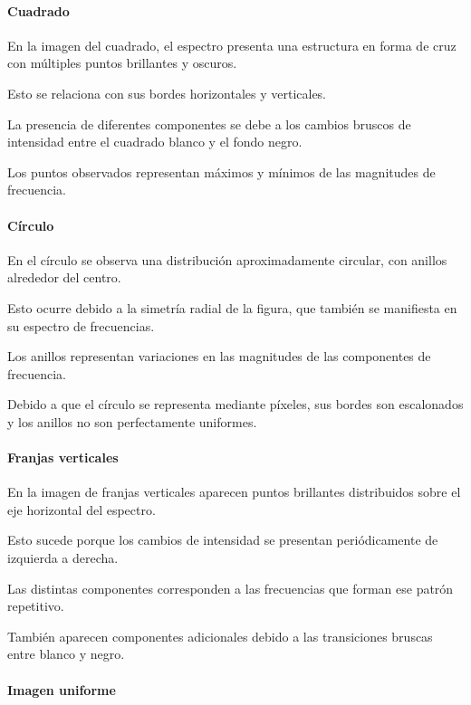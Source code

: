 \documentclass[11pt,letterpaper]{article}
\begin{document}
\paragraph{Cuadrado}

En la imagen del cuadrado, el espectro
presenta una estructura en forma de cruz
con múltiples puntos brillantes y oscuros.

Esto se relaciona con sus bordes horizontales
y verticales.

La presencia de diferentes componentes
se debe a los cambios bruscos de intensidad
entre el cuadrado blanco y el fondo negro.

Los puntos observados representan máximos
y mínimos de las magnitudes de frecuencia.

\paragraph{Círculo}

En el círculo se observa una distribución
aproximadamente circular, con anillos
alrededor del centro.

Esto ocurre debido a la simetría radial
de la figura, que también se manifiesta
en su espectro de frecuencias.

Los anillos representan variaciones
en las magnitudes de las componentes
de frecuencia.

Debido a que el círculo se representa
mediante píxeles, sus bordes son escalonados
y los anillos no son perfectamente uniformes.

\paragraph{Franjas verticales}

En la imagen de franjas verticales aparecen
puntos brillantes distribuidos sobre
el eje horizontal del espectro.

Esto sucede porque los cambios de intensidad
se presentan periódicamente de izquierda
a derecha.

Las distintas componentes corresponden
a las frecuencias que forman ese patrón
repetitivo.

También aparecen componentes adicionales
debido a las transiciones bruscas
entre blanco y negro.

\paragraph{Imagen uniforme}
\end{document}
